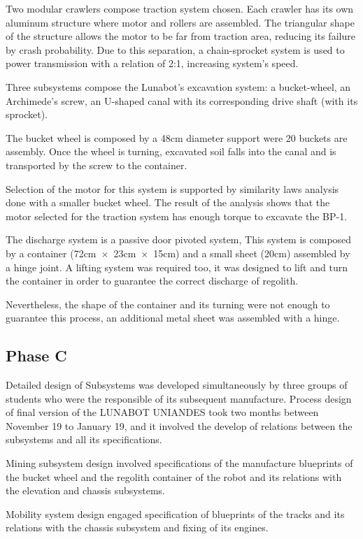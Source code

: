 \documentclass[conference]{IEEEtran}
\begin{document}
Two modular crawlers compose traction system chosen. Each crawler has its own aluminum structure where motor and rollers are assembled. The triangular shape of the structure allows the motor to be far from traction area, reducing its failure by crash probability. Due to this separation, a chain-sprocket system is used to power transmission with a relation of 2:1, increasing system’s speed. 

Three subsystems compose the Lunabot’s excavation system: a bucket-wheel, an Archimede’s screw, an U-shaped canal with its corresponding drive shaft (with its sprocket).

The bucket wheel is composed by a 48cm diameter support were 20 buckets are assembly. Once the wheel is turning, excavated soil falls into the canal and is transported by the screw to the container.

Selection of the motor for this system is supported by similarity laws analysis done with a smaller bucket wheel. The result of the analysis shows that the motor selected for the traction system has enough torque to excavate the BP-1.

The discharge system is a passive door pivoted system, This system is composed by a container (72cm~$ \times $~23cm~$ \times $~15cm) and a small sheet (20cm) assembled by a hinge joint. A lifting system was required too, it was designed to lift and turn the container in order to guarantee the correct discharge of regolith.

Nevertheless, the shape of the container and its turning were not enough to guarantee this process, an additional metal sheet was assembled with a hinge.


\subsection{Phase C}
Detailed design of Subsystems was developed simultaneously by three groups of students who were the responsible of its subsequent manufacture. Process design of final version of the LUNABOT UNIANDES took two months between November 19 to January 19, and it involved the develop of relations  between the subsystems and all its specifications.

Mining subsystem design involved specifications of the manufacture blueprints of the bucket wheel and the regolith container of the robot and its relations with the elevation and chassis subsystems.

Mobility system design engaged specification of blueprints of the tracks and its relations with the chassis subsystem and fixing of its engines.
\end{document}
